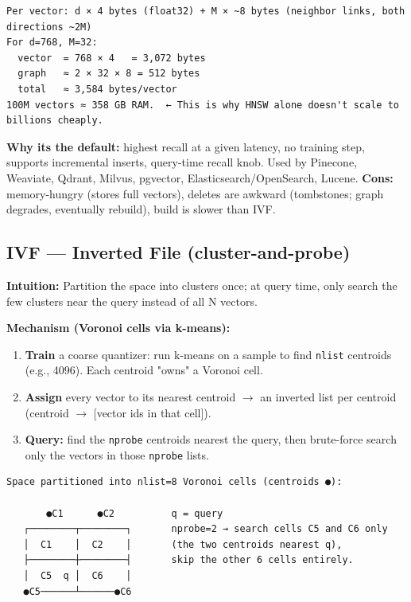 \documentclass[11pt]{article}
\providecommand{\tightlist}{\setlength{\itemsep}{1pt}\setlength{\parskip}{0pt}}
\begin{document}
\setcodelang{}

\begin{verbatim}
Per vector: d × 4 bytes (float32) + M × ~8 bytes (neighbor links, both directions ~2M)
For d=768, M=32:
  vector  = 768 × 4   = 3,072 bytes
  graph   ≈ 2 × 32 × 8 = 512 bytes
  total   ≈ 3,584 bytes/vector
100M vectors ≈ 358 GB RAM.  ← This is why HNSW alone doesn't scale to billions cheaply.
\end{verbatim}

\textbf{Why it\textquotesingle s the default:} highest recall at a given latency, no training step, supports incremental inserts, query-time recall knob. Used by Pinecone, Weaviate, Qdrant, Milvus, pgvector, Elasticsearch/OpenSearch, Lucene. \textbf{Cons:} memory-hungry (stores full vectors), deletes are awkward (tombstones; graph degrades, eventually rebuild), build is slower than IVF.

\subsection{IVF --- Inverted File (cluster-and-probe)}\label{ivf--inverted-file-cluster-and-probe}

\textbf{Intuition:} Partition the space into clusters once; at query time, only search the few clusters near the query instead of all N vectors.

\textbf{Mechanism (Voronoi cells via k-means):}

\begin{enumerate}
\def\labelenumi{\arabic{enumi}.}
\tightlist
\item
  \textbf{Train} a coarse quantizer: run k-means on a sample to find \texttt{nlist} centroids (e.g., 4096). Each centroid "owns" a Voronoi cell.
\item
  \textbf{Assign} every vector to its nearest centroid \(\rightarrow\) an inverted list per centroid (centroid \(\rightarrow\) {[}vector ids in that cell{]}).
\item
  \textbf{Query:} find the \texttt{nprobe} centroids nearest the query, then brute-force search only the vectors in those \texttt{nprobe} lists.
\end{enumerate}

\setcodelang{}

\begin{verbatim}
Space partitioned into nlist=8 Voronoi cells (centroids ●):

       ●C1      ●C2          q = query
   ┌────────┬────────┐       nprobe=2 → search cells C5 and C6 only
   │  C1    │  C2    │       (the two centroids nearest q),
   ├────────┼────────┤       skip the other 6 cells entirely.
   │  C5  q │  C6    │
   ●C5──────┴──────●C6
\end{verbatim}
\end{document}

